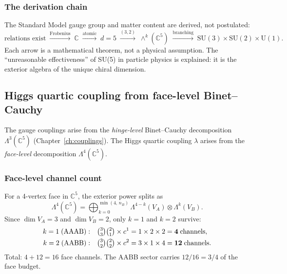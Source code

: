 \documentclass[12pt]{article}
\theoremstyle{remark}
\theoremstyle{definition}
\newcommand{\CC}{\mathbb{C}}
\begin{document}
\subsubsection{The derivation chain}

The Standard Model gauge group and matter content are derived, not postulated:
\begin{equation}
\text{relations exist} \;\xrightarrow{\text{Frobenius}}\; \CC \;\xrightarrow{\text{atomic}}\; d = 5 \;\xrightarrow{(3,2)}\; \wedge^k(\CC^5) \;\xrightarrow{\text{branching}}\; \text{SU}(3) \times \text{SU}(2) \times \text{U}(1).
\end{equation}
Each arrow is a mathematical theorem, not a physical assumption.  The ``unreasonable effectiveness'' of SU(5) in particle physics is explained: it is the exterior algebra of the unique chiral dimension.

\subsection{Higgs quartic coupling from face-level Binet--Cauchy}
\label{sec:higgs_quartic}

The gauge couplings arise from the \emph{hinge-level} Binet--Cauchy decomposition $\Lambda^3(\CC^5)$ (Chapter~\ref{ch:couplings}).  The Higgs quartic coupling $\lambda$ arises from the \emph{face-level} decomposition $\Lambda^4(\CC^5)$.

\subsubsection{Face-level channel count}

For a 4-vertex face in $\CC^5$, the exterior power splits as
\begin{equation}
\Lambda^4(\CC^5) = \bigoplus_{k=0}^{\min(4,\,n_B)} \Lambda^{4-k}(V_A) \otimes \Lambda^k(V_B).
\end{equation}
Since $\dim V_A = 3$ and $\dim V_B = 2$, only $k = 1$ and $k = 2$ survive:
\begin{align}
k = 1\;(\text{AAAB}):&\quad \tbinom{3}{3}\tbinom{2}{1}\times c^1 = 1 \times 2 \times 2 = \mathbf{4}\;\text{channels}, \\
k = 2\;(\text{AABB}):&\quad \tbinom{3}{2}\tbinom{2}{2}\times c^2 = 3 \times 1 \times 4 = \mathbf{12}\;\text{channels}.
\end{align}
Total: $4 + 12 = 16$ face channels.  The AABB sector carries $12/16 = 3/4$ of the face budget.
\end{document}
